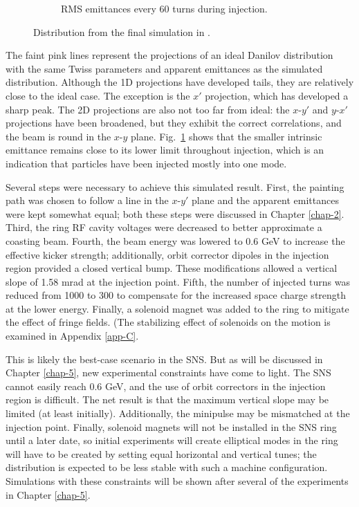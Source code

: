 \begin{figure}[!p]
\begin{subfigure}{0.5\textwidth}
        \caption{RMS emittances every 60 turns during injection.}
        \label{fig:Holmes_emittances}
    \end{subfigure}
    \caption{Distribution from the final simulation in \cite{Holmes2018}.}
    \label{fig:Holmes}
\end{figure}
%
The faint pink lines represent the projections of an ideal Danilov distribution with the same Twiss parameters and apparent emittances as the simulated distribution. Although the 1D projections have developed tails, they are relatively close to the ideal case. The exception is the $x'$ projection, which has developed a sharp peak. The 2D projections are also not too far from ideal: the $x$-$y'$ and $y$-$x'$ projections have been broadened, but they exhibit the correct correlations, and the beam is round in the $x$-$y$ plane. Fig.~\ref{fig:Holmes_emittances} shows that the smaller intrinsic emittance remains close to its lower limit throughout injection, which is an indication that particles have been injected mostly into one mode.

Several steps were necessary to achieve this simulated result. First, the painting path was chosen to follow a line in the $x$-$y'$ plane and the apparent emittances were kept somewhat equal; both these steps were discussed in Chapter \ref{chap-2}. Third, the ring RF cavity voltages were decreased to better approximate a coasting beam. Fourth, the beam energy was lowered to 0.6 GeV to increase the effective kicker strength; additionally, orbit corrector dipoles in the injection region provided a closed vertical bump. These modifications allowed a vertical slope of 1.58 mrad at the injection point. Fifth, the number of injected turns was reduced from 1000 to 300 to compensate for the increased space charge strength at the lower energy. Finally, a solenoid magnet was added to the ring to mitigate the effect of fringe fields. (The stabilizing effect of solenoids on the motion is examined in Appendix \ref{app-C}. 

This is likely the best-case scenario in the SNS. But as will be discussed in Chapter \ref{chap-5}, new experimental constraints have come to light. The SNS cannot easily reach 0.6 GeV, and the use of orbit correctors in the injection region is difficult. The net result is that the maximum vertical slope may be limited (at least initially). Additionally, the minipulse may be mismatched at the injection point. Finally, solenoid magnets will not be installed in the SNS ring until a later date, so initial experiments will create elliptical modes in the ring will have to be created by setting equal horizontal and vertical tunes; the distribution is expected to be less stable with such a machine configuration. Simulations with these constraints will be shown after several of the experiments in Chapter \ref{chap-5}.